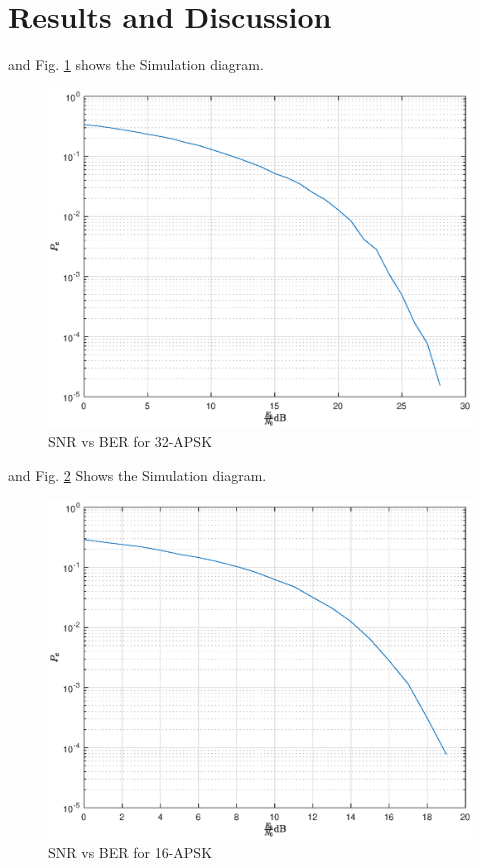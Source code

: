 \documentclass[journal,12pt,twocolumn]{IEEEtran}
\begin{document}
\section{Results and Discussion}
and  Fig. \ref{fig:32apsk1} shows the Simulation diagram.
\begin{figure}[!ht]
\begin{center}
\includegraphics[width=\columnwidth]{./figs/apsk32}
\end{center}
\caption{SNR vs BER for 32-APSK}
\label{fig:32apsk1}
\end{figure}
 and  Fig. \ref{fig:16apsk1} Shows the Simulation diagram.
\begin{figure}[!ht]
\begin{center}
\includegraphics[width=\columnwidth]{./figs/apsk16}
\end{center}
\caption{SNR vs BER for 16-APSK}
\label{fig:16apsk1}
\end{figure}
\end{document}
